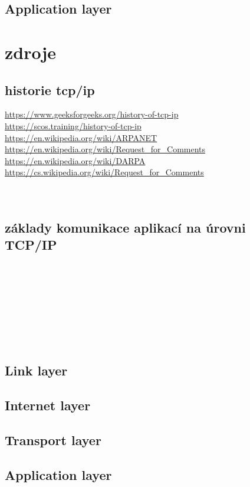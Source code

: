 \documentclass[12pt]{article}
\begin{document}
\subsection{Application layer}


\clearpage
\section{zdroje}
\subsection{historie tcp/ip}
\url{https://www.geeksforgeeks.org/history-of-tcp-ip}
\\
\url{https://scos.training/history-of-tcp-ip}
\\
\url{https://en.wikipedia.org/wiki/ARPANET}
\\
\url{https://en.wikipedia.org/wiki/Request_for_Comments}
\\
\url{https://en.wikipedia.org/wiki/DARPA}
\\
\url{https://cs.wikipedia.org/wiki/Request_for_Comments}
\\
\url{}
\\
\url{}
\\
\subsection{základy komunikace aplikací na úrovni TCP/IP}
\url{}
\\
\url{}
\\
\url{}
\\
\url{}
\\
\url{}
\\
\url{}
\\
\url{}
\\
\subsection{Link layer}
\url{}
\subsection{Internet layer}
\url{}
\subsection{Transport layer}
\url{}
\subsection{Application layer}
\url{}
\end{document}
